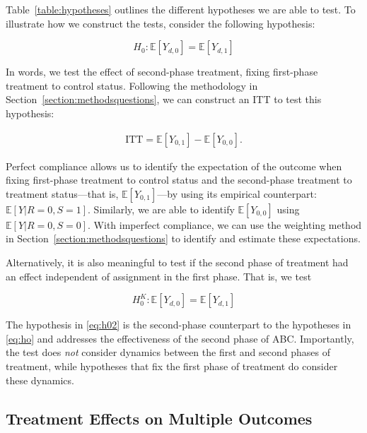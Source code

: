 \noindent Table~\ref{table:hypotheses} outlines the different hypotheses we are able to test. To illustrate how we construct the tests, consider the following hypothesis: 

\begin{equation}
H_{0}: \mathbb{E} \left[ Y_{d,0} \right]  = \mathbb{E} \left[ Y_{d,1} \right]  \label{eq:h0fixfirst}
\end{equation}

\noindent In words, we test the effect of second-phase treatment, fixing first-phase treatment to control status. Following the methodology in Section~\ref{section:methodsquestions}, we can construct an ITT to test this hypothesis: 

\begin{eqnarray}
\text{ITT} = \mathbb{E} \left[ Y_{0,1} \right] - \mathbb{E} \left[ Y_{0,0} \right]. 
\end{eqnarray}

\noindent Perfect compliance allows us to identify the expectation of the outcome when fixing first-phase treatment to control status and the second-phase treatment to treatment status---that is, $\mathbb{E} \left[ Y_{0,1} \right]$---by using its empirical counterpart: $\mathbb{E} \left[ Y | R = 0, S = 1 \right]$. Similarly, we are able to identify $\mathbb{E} \left[ Y_{0,0} \right]$ using $\mathbb{E} \left[ Y | R = 0, S = 0 \right]$. With imperfect compliance, we can use the weighting method in Section~\ref{section:methodsquestions} to identify and estimate these expectations.

\noindent Alternatively, it is also meaningful to test if the second phase of treatment had an effect independent of assignment in the first phase. That is, we test

\begin{equation}
H_{0}^K: \mathbb{E} \left[ Y_{d,0} \right] = \mathbb{E} \left[ Y_{d,1} \right] \label{eq:h02}
\end{equation}

\noindent The hypothesis in \eqref{eq:h02} is the second-phase counterpart to the hypotheses in \eqref{eq:ho} and addresses the effectiveness of the second phase of ABC. Importantly, the test does \emph{not} consider dynamics between the first and second phases of treatment, while hypotheses that fix the first phase of treatment do consider these dynamics.\\

\subsection{Treatment Effects on Multiple Outcomes} \label{section:counts}

